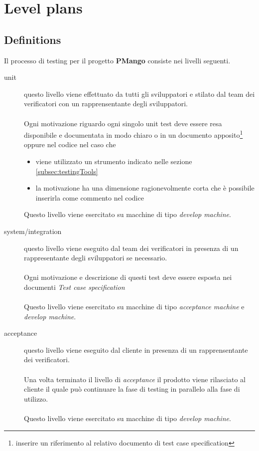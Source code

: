 \section{Level plans}
\label{sec:levelPlans}
\subsection{Definitions}
\label{subsec:strategy}
Il processo di testing per il progetto \textbf{PMango} consiste nei livelli
seguenti.
\begin{description} 
\item[unit] questo livello viene effettuato da tutti gli
sviluppatori e stilato dal team dei verificatori con un rapprensentante degli
sviluppatori. 
\\ \\
Ogni motivazione riguardo ogni singolo unit test deve essere resa disponibile e
documentata in modo chiaro o in un documento apposito\footnote{inserire un
riferimento al relativo documento di test case specification} oppure nel codice
nel caso che 
\begin{itemize}
	\item viene utilizzato un strumento indicato nelle sezione
	\ref{subsec:testingTools}
	\item la motivazione ha una dimensione ragionevolmente corta che \`e
	possibile inserirla come commento nel codice 
\end{itemize}

Questo livello viene esercitato su macchine di tipo \emph{develop machine}.

\item[system/integration] questo livello viene eseguito dal
team dei verificatori in presenza di un rappresentante degli sviluppatori
se necessario. 
\\ \\
Ogni motivazione e descrizione di questi test deve essere esposta nei documenti
\emph{Test case specification}
\\ \\
Questo livello viene esercitato su macchine di tipo \emph{acceptance machine} e
\emph{develop machine}.

\item[acceptance] questo livello viene eseguito dal cliente in presenza di un
rapprensentante dei verificatori.
\\ \\
Una volta terminato il livello di \emph{acceptance} il prodotto viene
rilasciato al cliente il quale pu\`o continuare la fase di testing in parallelo
alla fase di utilizzo.
\\ \\
Questo livello viene esercitato su macchine di tipo \emph{develop machine}.

\end{description}

